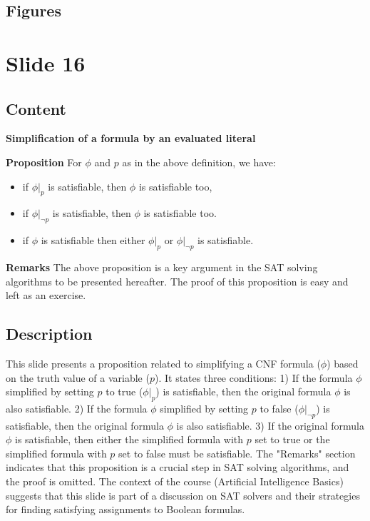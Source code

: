 \documentclass{article}%
\begin{document}
\subsection{Figures}%
\begin{figure}[H]%
\centering%
\end{figure}

%
\newpage%
\section{Slide 16}%
\label{sec:Slide16}%
\subsection{Content}%

\textbf{Simplification of a formula by an evaluated literal}

\textbf{Proposition}
For $\phi$ and $p$ as in the above definition, we have:
\begin{itemize}
    \item if $\phi|_p$ is satisfiable, then $\phi$ is satisfiable too,
    \item if $\phi|_{\neg p}$ is satisfiable, then $\phi$ is satisfiable too.
    \item if $\phi$ is satisfiable then either $\phi|_p$ or $\phi|_{\neg p}$ is satisfiable.
\end{itemize}

\textbf{Remarks}
The above proposition is a key argument in the SAT solving algorithms to be presented hereafter.
The proof of this proposition is easy and left as an exercise.
%
\subsection{Description}%
This slide presents a proposition related to simplifying a CNF formula ($\phi$) based on the truth value of a variable ($p$).  It states three conditions: 1) If the formula $\phi$ simplified by setting $p$ to true ($\phi|_p$) is satisfiable, then the original formula $\phi$ is also satisfiable. 2) If the formula $\phi$ simplified by setting $p$ to false ($\phi|_{\neg p}$) is satisfiable, then the original formula $\phi$ is also satisfiable. 3) If the original formula $\phi$ is satisfiable, then either the simplified formula with $p$ set to true or the simplified formula with $p$ set to false must be satisfiable.  The "Remarks" section indicates that this proposition is a crucial step in SAT solving algorithms, and the proof is omitted.  The context of the course (Artificial Intelligence Basics) suggests that this slide is part of a discussion on SAT solvers and their strategies for finding satisfying assignments to Boolean formulas.%
\end{document}
